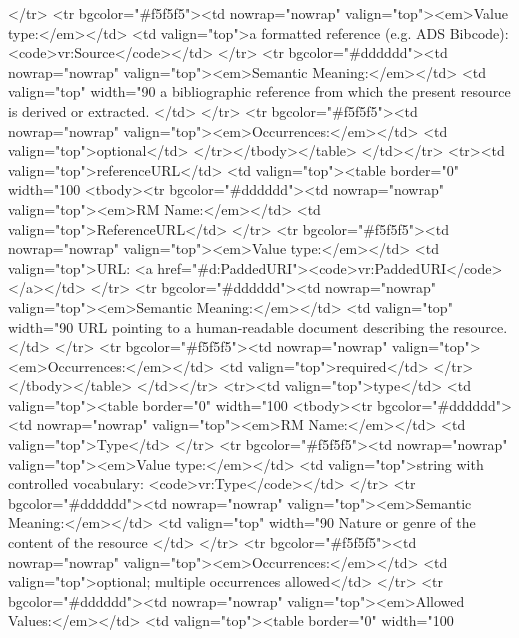 \documentclass[11pt,a4paper]{ivoa}
\begin{document}
          </tr>
          <tr bgcolor="#f5f5f5"><td nowrap="nowrap" valign="top"><em>Value type:</em></td>
              <td valign="top">a formatted reference (e.g. ADS Bibcode): <code>vr:Source</code></td>
          </tr>
          <tr bgcolor="#dddddd"><td nowrap="nowrap" valign="top"><em>Semantic Meaning:</em></td>
              <td valign="top" width="90%
                a bibliographic reference from which the present resource is 
                derived or extracted.
              </td> 
          </tr>
          <tr bgcolor="#f5f5f5"><td nowrap="nowrap" valign="top"><em>Occurrences:</em></td>
              <td valign="top">optional</td>
          </tr></tbody></table>
      </td></tr>
  <tr><td valign="top">referenceURL</td>
      <td valign="top"><table border="0" width="100%
          <tbody><tr bgcolor="#dddddd"><td nowrap="nowrap" valign="top"><em>RM Name:</em></td>
              <td valign="top">ReferenceURL</td>
          </tr>
          <tr bgcolor="#f5f5f5"><td nowrap="nowrap" valign="top"><em>Value type:</em></td>
              <td valign="top">URL: <a href="#d:PaddedURI"><code>vr:PaddedURI</code></a></td>
          </tr>
          <tr bgcolor="#dddddd"><td nowrap="nowrap" valign="top"><em>Semantic Meaning:</em></td>
              <td valign="top" width="90%
                URL pointing to a human-readable document describing the 
                resource.
              </td> 
          </tr>
          <tr bgcolor="#f5f5f5"><td nowrap="nowrap" valign="top"><em>Occurrences:</em></td>
              <td valign="top">required</td>
          </tr></tbody></table>
      </td></tr>
  <tr><td valign="top">type</td>
      <td valign="top"><table border="0" width="100%
          <tbody><tr bgcolor="#dddddd"><td nowrap="nowrap" valign="top"><em>RM Name:</em></td>
              <td valign="top">Type</td>
          </tr>
          <tr bgcolor="#f5f5f5"><td nowrap="nowrap" valign="top"><em>Value type:</em></td>
              <td valign="top">string with controlled vocabulary: <code>vr:Type</code></td>
          </tr>
          <tr bgcolor="#dddddd"><td nowrap="nowrap" valign="top"><em>Semantic Meaning:</em></td>
              <td valign="top" width="90%
                Nature or genre of the content of the resource
              </td> 
          </tr>
          <tr bgcolor="#f5f5f5"><td nowrap="nowrap" valign="top"><em>Occurrences:</em></td>
              <td valign="top">optional; multiple occurrences allowed</td>
          </tr>
          <tr bgcolor="#dddddd"><td nowrap="nowrap" valign="top"><em>Allowed Values:</em></td>
              <td valign="top"><table border="0" width="100%
\end{document}
